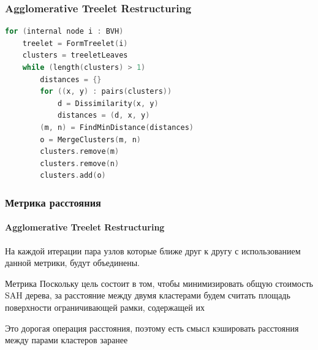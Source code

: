 \begin{frame}[fragile]
    \frametitle{Agglomerative Treelet Restructuring}
    \begin{lstlisting}[language=C++,basicstyle=\ttfamily,keywordstyle=\color{blue}]
for (internal node i : BVH)
    treelet = FormTreelet(i)
    clusters = treeletLeaves
    while (length(clusters) > 1)
        distances = {}
        for ((x, y) : pairs(clusters))
            d = Dissimilarity(x, y)
            distances = (d, x, y)
        (m, n) = FindMinDistance(distances)
        o = MergeClusters(m, n)
        clusters.remove(m)
        clusters.remove(n)
        clusters.add(o)
    \end{lstlisting}
\end{frame}

\begin{frame}
    \frametitle{Метрика расстояния}
    \framesubtitle{Agglomerative Treelet Restructuring}
    \begin{block}{}
        На каждой итерации пара узлов
        которые ближе друг к другу с использованием данной метрики, будут объединены.
    \end{block}

    \begin{block}{Метрика}
        Поскольку цель состоит в том, чтобы минимизировать общую стоимость SAH дерева,
        за расстояние между двумя кластерами будем считать площадь поверхности
        ограничивающей рамки, содержащей их
    \end{block}

    Это дорогая операция расстояния, поэтому есть смысл кэшировать расстояния между парами кластеров
    заранее 
\end{frame}

